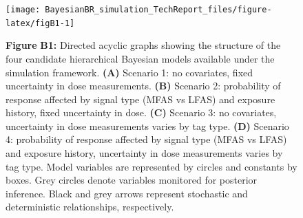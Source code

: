 \documentclass[
]{article}
\begin{document}
\begin{figure}

{\centering \texttt{[image: BayesianBR\_simulation\_TechReport\_files/figure-latex/figB1-1]} 

}

\textbf{Figure }{\textbf{B1:} \hypertarget{figB1}{}Directed acyclic graphs showing the structure of the four candidate hierarchical Bayesian models available under the simulation framework. \textbf{(A)} Scenario 1: no covariates, fixed uncertainty in dose measurements. \textbf{(B)} Scenario 2: probability of response affected by signal type (MFAS vs LFAS) and exposure history, fixed uncertainty in dose. \textbf{(C)} Scenario 3: no covariates, uncertainty in dose measurements varies by tag type. \textbf{(D)} Scenario 4: probability of response affected by signal type (MFAS vs LFAS) and exposure history, uncertainty in dose measurements varies by tag type. Model variables are represented by circles and constants by boxes. Grey circles denote variables monitored for posterior inference. Black and grey arrows represent stochastic and deterministic relationships, respectively.}\label{fig:figB1}
\end{figure}
\end{document}
